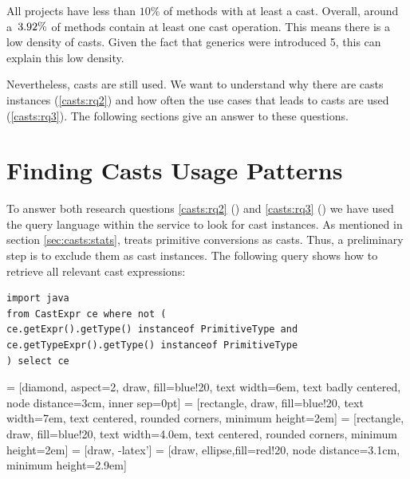 All projects have less than $10\%$ of methods with at least a cast.
Overall, around a~$3.92\%{}$ of methods contain at least one cast operation. 
This means there is a low density of casts.
Given the fact that generics were introduced \java{} 5, this can explain this low density.

Nevertheless, casts are still used.
We want to understand why there are casts instances (\ref{casts:rq2}) and how often the use cases that leads to casts are used (\ref{casts:rq3}).
The following sections give an answer to these questions.


\section{Finding Casts Usage Patterns}
\label{sec:casts:methodology}

To answer both research questions
\ref{casts:rq2} (\emph{\crqB}) and \ref{casts:rq3} (\emph{\crqC}) we have used the \ql{} query language within the \lgtm{} service to look for cast instances.
As mentioned in section \ref{sec:casts:stats}, \ql{} treats primitive conversions as casts.
Thus, a preliminary step is to exclude them as cast instances.
The following \ql{} query shows how to retrieve all relevant cast expressions:

\begin{lstlisting}[style=ql,caption=\ql{} query to retrieve all relevant cast expressions.]
import java
from CastExpr ce where not (
ce.getExpr().getType() instanceof PrimitiveType and
ce.getTypeExpr().getType() instanceof PrimitiveType
) select ce
\end{lstlisting}

 = [diamond, aspect=2, draw, fill=blue!20, 
    text width=6em, text badly centered, node distance=3cm, inner sep=0pt]
 = [rectangle, draw, fill=blue!20, 
    text width=7em, text centered, rounded corners, minimum height=2em]
 = [rectangle, draw, fill=blue!20, 
    text width=4.0em, text centered, rounded corners, minimum height=2em]
 = [draw, -latex']
 = [draw, ellipse,fill=red!20, node distance=3.1cm,
    minimum height=2.9em]

